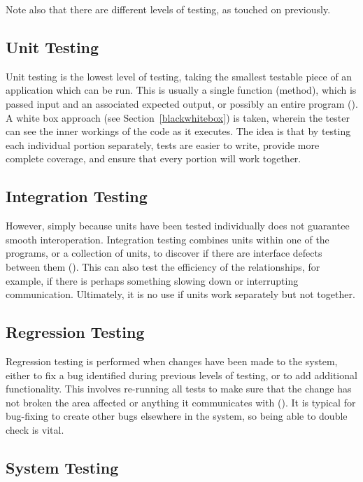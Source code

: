 \documentclass[12pt]{article}
\begin{document}
Note also that there are different levels of testing, as touched on previously.


\subsection{Unit Testing} \label{unit_testing}

Unit testing is the lowest level of testing, taking the smallest testable piece of an application which can be run. This is usually a single function (method), which is passed input and an associated expected output, or possibly an entire program (). A white box approach (see Section~\ref{blackwhitebox}) is taken, wherein the tester can see the inner workings of the code as it executes. The idea is that by testing each individual portion separately, tests are easier to write, provide more complete coverage, and ensure that every portion will work together.


\subsection{Integration Testing}

However, simply because units have been tested individually does not guarantee smooth interoperation. Integration testing combines units within one of the programs, or a collection of units, to discover if there are interface defects between them (). This can also test the efficiency of the relationships, for example, if there is perhaps something slowing down or interrupting communication. Ultimately, it is no use if units work separately but not together.


\subsection{Regression Testing}

Regression testing is performed when changes have been made to the system, either to fix a bug identified during previous levels of testing, or to add additional functionality. This involves re-running all tests to make sure that the change has not broken the area affected or anything it communicates with (). It is typical for bug-fixing to create other bugs elsewhere in the system, so being able to double check is vital.


\subsection{System Testing}
\end{document}
